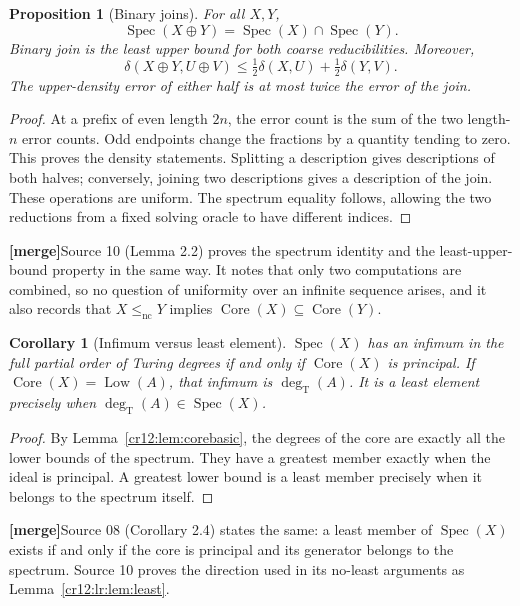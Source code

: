 \documentclass[11pt,letterpaper]{article}
\theoremstyle{plain}
\newtheorem{proposition}[theorem]{Proposition}
\newtheorem{corollary}[theorem]{Corollary}
\theoremstyle{definition}
\theoremstyle{remark}
\numberwithin{equation}{section}
\newcommand{\lenc}{\leq_{\mathrm{nc}}}
\newcommand{\Core}{\operatorname{Core}}
\newcommand{\Low}{\operatorname{Low}}
\newcommand{\Spec}{\operatorname{Spec}}
\newcommand{\degT}{\deg_{\mathrm T}}
\newcommand{\mergenote}[1]{\par\smallskip\noindent
 {\small\textsf{\textbf{[merge]}}\enspace #1}\par\smallskip}
\begin{document}
\begin{proposition}[Binary joins]\label{cr12:prop:joins}
For all $X,Y$,
\begin{equation}\label{cr12:eq:join-spectrum}
 \Spec(X\oplus Y)=\Spec(X)\cap\Spec(Y).
\end{equation}
Binary join is the least upper bound for both coarse reducibilities.
Moreover,
\begin{equation}\label{cr12:eq:join-distance}
 \delta(X\oplus Y,U\oplus V)
 \le\tfrac12\delta(X,U)+\tfrac12\delta(Y,V).
\end{equation}
The upper-density error of either half is at most twice the error of the join.
\end{proposition}
\begin{proof}
At a prefix of even length $2n$, the error count is the sum of the two length-$n$
error counts. Odd endpoints change the fractions by a quantity tending to zero.
This proves the density statements. Splitting a description gives descriptions
of both halves; conversely, joining two descriptions gives a description of the
join. These operations are uniform. The spectrum equality follows, allowing the
two reductions from a fixed solving oracle to have different indices.
\end{proof}
\mergenote{Source 10 (Lemma 2.2) proves the spectrum identity and the least-upper-bound
property in the same way. It notes that only two computations are combined, so no
question of uniformity over an infinite sequence arises, and it also records that
$X\lenc Y$ implies $\Core(X)\subseteq\Core(Y)$.}

\begin{corollary}[Infimum versus least element]\label{cr12:cor:infimum}
$\Spec(X)$ has an infimum in the full partial order of Turing degrees if and
only if $\Core(X)$ is principal. If $\Core(X)=\Low(A)$, that infimum is
$\degT(A)$. It is a least element precisely when
$\degT(A)\in\Spec(X)$.
\end{corollary}
\begin{proof}
By Lemma~\ref{cr12:lem:corebasic}, the degrees of the core are exactly all the lower
bounds of the spectrum. They have a greatest member exactly when the ideal is
principal. A greatest lower bound is a least member precisely when it belongs
to the spectrum itself.
\end{proof}
\mergenote{Source 08 (Corollary 2.4) states the same: a least member of $\Spec(X)$ exists
if and only if the core is principal and its generator belongs to the spectrum.
Source 10 proves the direction used in its no-least arguments as
Lemma~\ref{cr12:lr:lem:least}.}
\end{document}
